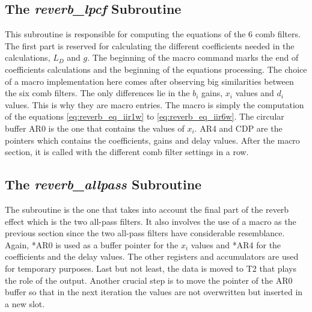 \subsection{The \textit{reverb_lpcf} Subroutine}
This subroutine is responsible for computing the equations of the 6 comb filters. The first part is reserved for calculating the different coefficients needed in the calculations, $L_D$ and $g$. The beginning of the macro command marks the end of coefficients calculations and the beginning of the equations processing. The choice of a macro implementation here comes after observing big similarities between the six comb filters. The only differences lie in the $b_{i}$ gains, $x_{i}$ values and $d_{i}$ values. This is why they are macro entries. The macro is simply the computation of the equations \ref{eq:reverb_eq_iir1w} to \ref{eq:reverb_eq_iir6w}. The circular buffer AR0 is the one that contains the values of $x_{i}$. AR4 and CDP are the pointers which contains the coefficients, gains and delay values.
After the macro section, it is called with the different comb filter settings in a row. 

\subsection{The \textit{reverb_allpass} Subroutine}
The subroutine is the one that takes into account the final part of the \gls{reverb} effect which is the two all-pass filters. It also involves the use of a macro as the previous section since the two all-pass filters have considerable resemblance. Again, *AR0 is used as a buffer pointer for the $x_{i}$ values and *AR4 for the coefficients and the delay values. The other registers and accumulators are used for temporary purposes.
Last but not least, the data is moved to T2 that plays the role of the output. 
Another crucial step is to move the pointer of the AR0 buffer so that in the next iteration the values are not overwritten but inserted in a new slot.
